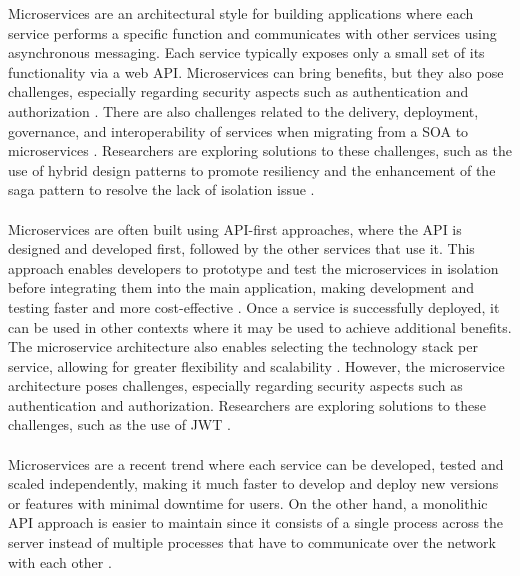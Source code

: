 \documentclass[BIF,Bachelor,nenglish]{twbook}%
\begin{document}
\noindent
Microservices are an architectural style for building applications where each service performs a specific function and communicates with other services using asynchronous messaging. Each service typically exposes only a small set of its functionality via a web \ac{API}. Microservices can bring benefits, but they also pose challenges, especially regarding security aspects such as authentication and authorization \cite{alm2022} . There are also challenges related to the delivery, deployment, governance, and interoperability of services when migrating from a \ac{SOA} to microservices \cite{raj2021} . Researchers are exploring solutions to these challenges, such as the use of hybrid design patterns to promote resiliency and the enhancement of the saga pattern to resolve the lack of isolation issue \cite{ras2022, dar2022} .
\\
\\
Microservices are often built using \ac{API}-first approaches, where the \ac{API} is designed and developed first, followed by the other services that use it. This approach enables developers to prototype and test the microservices in isolation before integrating them into the main application, making development and testing faster and more cost-effective \cite{alm2022} . Once a service is successfully deployed, it can be used in other contexts where it may be used to achieve additional benefits. The microservice architecture also enables selecting the technology stack per service, allowing for greater flexibility and scalability \cite{dar2022} . However, the microservice architecture poses challenges, especially regarding security aspects such as authentication and authorization. Researchers are exploring solutions to these challenges, such as the use of \ac{JWT} \cite{alm2022} .
\\
\\
Microservices are a recent trend where each service can be developed, tested and scaled independently, making it much faster to develop and deploy new versions or features with minimal downtime for users. On the other hand, a monolithic \ac{API} approach is easier to maintain since it consists of a single process across the server instead of multiple processes that have to communicate over the network with each other \cite{pat2021}.
\end{document}
